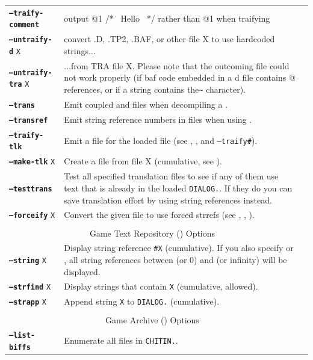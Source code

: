 \documentclass{article}
\def\ttref#1{\ahrefloc{#1}{\tt #1}}
\def\DEFINE#1{{\tt \bf #1}\label{#1}\index{#1}}
\def\t#1{{\tt #1}}
\begin{document}
\begin{tabular}{lp{10in}|p{10in}}
\DEFINE{--traify-comment} & output @1 /* ~Hello~ */ rather than @1 when traifying \\
\DEFINE{--untraify-d} \t{X} & convert .D, .TP2, .BAF, or other file X to use hardcoded strings... \\
\DEFINE{--untraify-tra} \t{X} & ...from TRA file X. Please note that the outcoming file
  could not work properly (if baf code embedded in a d file contains @ references, or if a string contains
  the\verb+~+ character). \\
\DEFINE{--trans} & Emit coupled \ttref{D} and \ttref{TRA} files when
  decompiling a \ttref{DLG}.  \\
\DEFINE{--transref} &	Emit string reference numbers in \ttref{TRA} files
when using \ttref{--trans}. \\
\DEFINE{--traify-tlk} & Emit a \ttref{TRA} file for the loaded \ttref{TLK} file (see \ttref{--tlkin}, \ttref{--out}, \ttref{--min} and \t{--traify\#}). \\
\DEFINE{--make-tlk} \t{X} & Create a \ttref{TLK} file from \ttref{TRA} file X (cumulative, see \ttref{--tlkout}). \\
\DEFINE{--testtrans} &	Test all specified \ttref{TRA} translation files to
see if any of them use text that is already in the loaded
\t{DIALOG.}\ttref{TLK}. If they do you can save translation effort by using
string references instead. \\
\DEFINE{--forceify} \t{X} & Convert the given \ttref{D} file to use forced
strrefs (see \ttref{--out}, \ttref{SAY}, \ttref{Forced String Reference}). \\
\\
\multicolumn{2}{c}{ \color{red} Game Text Repository (\ttref{TLK}) Options} \\
\DEFINE{--string} \t{X}&	Display string reference {\tt \#X} (cumulative). If you also specify \ttref{--min} or \ttref{--max}, all string references between \ttref{--min} (or 0) and \ttref{--max} (or infinity) will be displayed. \\
\DEFINE{--strfind} \t{X}&	Display strings that contain {\tt X} (cumulative, \ttref{regexp} allowed). \\
\DEFINE{--strapp} \t{X}&	Append string \t{X} to \t{DIALOG.}\ttref{TLK} (cumulative). \\
\\
\multicolumn{2}{c}{ \color{red} Game Archive (\ttref{BIFF}) Options} \\
\DEFINE{--list-biffs}&	Enumerate all \ttref{BIFF} files in \t{CHITIN.}\ttref{KEY}. \\

\end{tabular}
\end{document}
